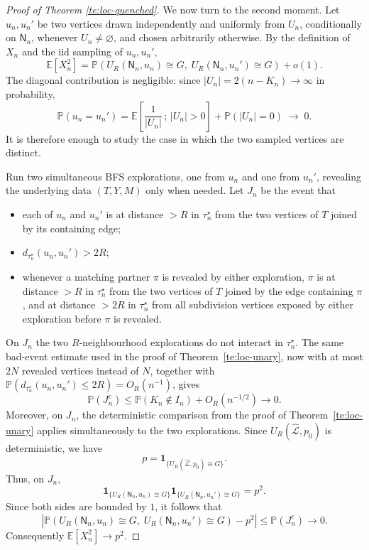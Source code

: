 \documentclass[english,11pt]{smfart}
\newcommand{\Prb}[1]{\mathbb{P}\left(#1\right)}
\newcommand{\Ex}[1]{\mathbb{E}[#1]}
\newcommand{\Exb}[1]{\mathbb{E}\left[#1\right]}
\newcommand{\cL}{\mathcal{L}}
\newcommand{\mN}{\mathsf{N}}
\numberwithin{equation}{section}
\begin{document}
\begin{proof}[Proof of Theorem \ref{te:loc-quenched}]
We now turn to the second moment. Let \(u_n,u_n'\) be two vertices drawn independently and uniformly from \(U_n\),
conditionally on \(\mN_n\), whenever \(U_n\ne\varnothing\), and chosen
arbitrarily otherwise. By the definition of \(X_n\) and the iid sampling of
\(u_n,u_n'\),
\[
  \Ex{X_n^2}
  =
  \Prb{
    U_R(\mN_n,u_n)\cong G,\;
    U_R(\mN_n,u_n')\cong G
  }
  +o(1).
\]
The diagonal contribution is negligible: since \(|U_n|=2(n-K_n)\to\infty\) in
probability,
\[
  \Prb{u_n=u_n'}
  =
  \Exb{\frac{1}{|U_n|}\,;\,|U_n|>0}
  +\Prb{|U_n|=0}
  \;\longrightarrow\;0.
\]
It is therefore enough to study the case in which the two sampled vertices are
distinct.
\smallskip

Run two simultaneous BFS explorations, one from \(u_n\) and one from \(u_n'\),
revealing the underlying data \((T,Y,M)\) only when needed. Let \(J_n\) be the
event that
\begin{itemize}\itemsep0pt
\item each of \(u_n\) and \(u_n'\) is at distance \(>R\) in \(\tau_n^{\star}\) from
  the two vertices of \(T\) joined by its containing edge;
\item \(d_{\tau_n^{\star}}(u_n,u_n')>2R\);
\item whenever a matching partner \(\pi\) is revealed by either exploration,
  \(\pi\) is at distance \(>R\) in \(\tau_n^{\star}\) from the two vertices of \(T\)
  joined by the edge containing \(\pi\), and at distance \(>2R\) in
  \(\tau_n^{\star}\) from all subdivision vertices exposed by either exploration
  before \(\pi\) is revealed.
\end{itemize}
On \(J_n\) the two \(R\)-neighbourhood explorations do not interact in
\(\tau_n^{\star}\). The same bad-event estimate used in the proof of
Theorem~\ref{te:loc-unary}, now with at most \(2N\) revealed vertices
instead of \(N\), together with
\(\Prb{d_{\tau_n^{\star}}(u_n,u_n')\le2R}=O_R(n^{-1})\), gives
\[
  \Prb{J_n^c}\le \Prb{K_n\notin I_n}+O_R(n^{-1/2})\to0.
\]
Moreover, on \(J_n\), the deterministic comparison from the proof of
Theorem~\ref{te:loc-unary} applies simultaneously to the two explorations. Since
\(U_R(\hat{\cL},p_0)\) is deterministic, we have
\[
  p=\mathbf 1_{\{U_R(\hat{\cL},p_0)\cong G\}}.
\]
Thus, on \(J_n\),
\[
  \mathbf 1_{\{U_R(\mN_n,u_n)\cong G\}}
  \mathbf 1_{\{U_R(\mN_n,u_n')\cong G\}}
  =p^2.
\]
Since both sides are bounded by \(1\), it follows that
\[
  \left|
  \Prb{
    U_R(\mN_n,u_n)\cong G,\;
    U_R(\mN_n,u_n')\cong G
  }
  -p^2
  \right|
  \le \Prb{J_n^c}\to0.
\]
Consequently \(\Ex{X_n^2}\to p^2\).
\smallskip


\end{proof}
\end{document}

